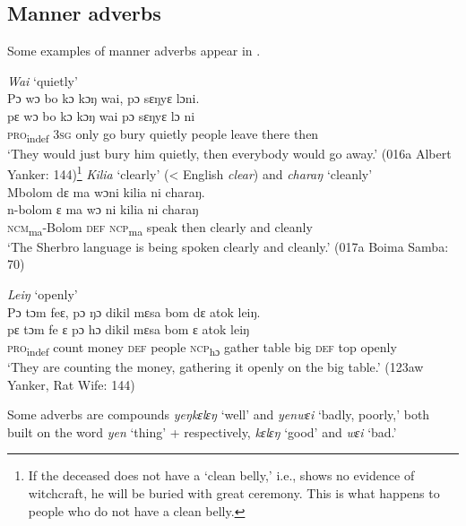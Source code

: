 \subsection{Manner adverbs}\label{sec:3.10.1}
\hypertarget{Toc115517775}{}
Some examples of manner adverbs appear in .

\ea%
    \label{ex:97}
 \ea \label{ex:97a}
 \textit{Wai} ‘quietly'\\
 \vspace{6pt}
Pɔ wɔ bo kɔ kɔŋ wai, pɔ sɛŋyɛ lɔni.\\
\gll pɛ      wɔ    bo    kɔ    kɔŋ  wai    pɔ      sɛŋyɛ    lɔ    ni\\
\textsc{pro}\textsubscript{indef}  \textsc{3sg}  only  go    bury  quietly  people  leave    there  then\\
\glt ‘They would just bury him quietly, then everybody would go away.' (016a Albert Yanker: 144)\footnote{If the deceased does not have a ‘clean belly,' i.e., shows no evidence of witchcraft, he will be buried with great ceremony. This is what happens to people who do not have a clean belly.}
 \vspace{6pt}
\ex \label{ex:97b}
\textit{Kilia} ‘clearly' (< English \textit{clear}) and \textit{charaŋ} ‘cleanly'\\
\vspace{6pt}
 Mbolom dɛ ma wɔni kilia ni charaŋ.\\
\gll n-bolom      ɛ    ma    wɔ      ni    kilia    ni    charaŋ\\
\textsc{ncm}\textsubscript{ma}{}-Bolom  \textsc{def}  \textsc{ncp}\textsubscript{ma}    speak    then  clearly  and  cleanly\\
\glt ‘The Sherbro language is being spoken clearly and cleanly.' (017a Boima Samba: 70)


 
\ex \textit{Leiŋ} ‘openly'\\
\vspace{6pt}
 Pɔ  tɔm feɛ, pɔ ŋɔ dikil mɛsa bom dɛ atok leiŋ.\\
\gll pɛ      tɔm    fe      ɛ    pɔ      hɔ      dikil    mɛsa  bom  ɛ    atok  leiŋ\\
\textsc{pro}\textsubscript{indef}  count    money  \textsc{def}  people  \textsc{ncp}\textsubscript{hɔ}    gather  table  big  \textsc{def}  top  openly\\
\glt ‘They are counting the money, gathering it openly on the big table.' (123aw Yanker, Rat Wife: 144)
\z
\z

Some adverbs are compounds \textit{yeŋkɛlɛŋ} ‘well' and \textit{yenwɛi} ‘badly, poorly,' both built on the word \textit{yen} ‘thing' + respectively, \textit{kɛlɛŋ} ‘good' and \textit{wɛi} ‘bad.'

